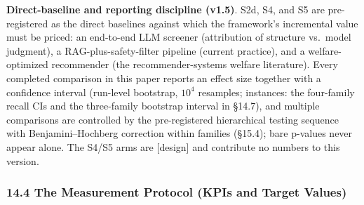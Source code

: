 \documentclass[
  11pt]{article}
\begin{document}
\textbf{Direct-baseline and reporting discipline (v1.5)}. S2d, S4, and
S5 are pre-registered as the direct baselines against which the
framework's incremental value must be priced: an end-to-end LLM screener
(attribution of structure vs.~model judgment), a RAG-plus-safety-filter
pipeline (current practice), and a welfare-optimized recommender (the
recommender-systems welfare literature). Every completed comparison in
this paper reports an effect size together with a confidence interval
(run-level bootstrap, \(10^4\) resamples; instances: the four-family
recall CIs and the three-family bootstrap interval in §14.7), and
multiple comparisons are controlled by the pre-registered hierarchical
testing sequence with Benjamini--Hochberg correction within families
(§15.4); bare p-values never appear alone. The S4/S5 arms are
{[}design{]} and contribute no numbers to this version.

\subsubsection{14.4 The Measurement Protocol (KPIs and Target
Values)}\label{the-measurement-protocol-kpis-and-target-values}
\end{document}
